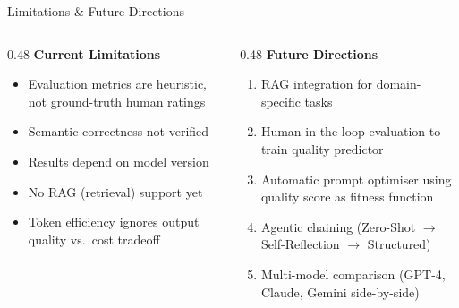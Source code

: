 \documentclass[aspectratio=169, 12pt]{beamer}
\begin{document}
\begin{frame}{Limitations \& Future Directions}
  \begin{columns}[T]
    \begin{column}{0.48\textwidth}
      \textbf{Current Limitations}
      \begin{itemize}
        \item Evaluation metrics are heuristic, not ground-truth human ratings
        \item Semantic correctness not verified
        \item Results depend on model version
        \item No RAG (retrieval) support yet
        \item Token efficiency ignores output quality vs.\ cost tradeoff
      \end{itemize}
    \end{column}
    \begin{column}{0.48\textwidth}
      \textbf{Future Directions}
      \begin{enumerate}
        \item RAG integration for domain-specific tasks
        \item Human-in-the-loop evaluation to train quality predictor
        \item Automatic prompt optimiser using quality score as fitness function
        \item Agentic chaining (Zero-Shot $\rightarrow$ Self-Reflection
              $\rightarrow$ Structured)
        \item Multi-model comparison (GPT-4, Claude, Gemini side-by-side)
      \end{enumerate}
    \end{column}
  \end{columns}
\end{frame}
\end{document}
